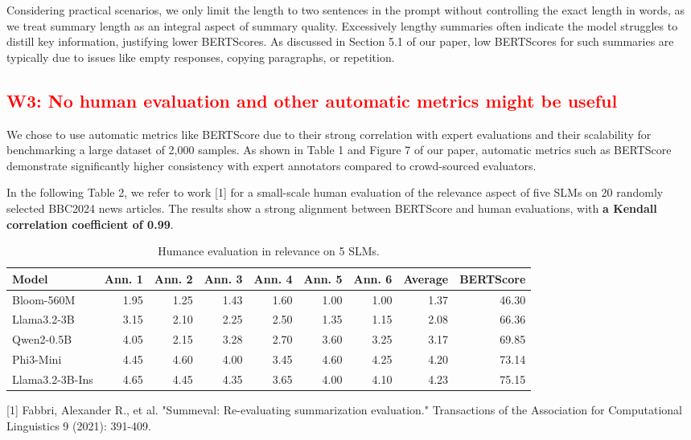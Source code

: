 \documentclass[a4paper]{article}
\begin{document}
Considering practical scenarios, we only limit the length to two sentences in the prompt without controlling the exact length in words, as we treat summary length as an integral aspect of summary quality. Excessively lengthy summaries often indicate the model struggles to distill key information, justifying lower BERTScores. As discussed in Section 5.1 of our paper, low BERTScores for such summaries are typically due to issues like empty responses, copying paragraphs, or repetition.





\subsection{\textcolor{red}{W3: No human evaluation and other automatic metrics might be useful}}

{We chose to use automatic metrics like BERTScore due to their strong correlation with expert evaluations and their scalability for benchmarking a large dataset of 2,000 samples. As shown in Table 1 and Figure 7 of our paper, automatic metrics such as BERTScore demonstrate significantly higher consistency with expert annotators compared to crowd-sourced evaluators.}

{In the following Table 2, we refer to work [1] for a small-scale human evaluation of the relevance aspect of five SLMs on 20 randomly selected BBC2024 news articles. The results show a strong alignment between BERTScore and human evaluations, with \textbf{a Kendall correlation coefficient of 0.99}.}

\begin{table}[h]
\centering
\caption{Humance evaluation in relevance on 5 SLMs.}
\label{tab:my-table}
\begin{tabular}{lrrrrrrrr}
\hline
Model           & Ann. 1 & Ann. 2 & Ann. 3 & Ann. 4 & Ann. 5 & Ann. 6 & Average & BERTScore \\ \hline
Bloom-560M      & 1.95   & 1.25   & 1.43   & 1.60   & 1.00   & 1.00   & 1.37    & 46.30     \\
Llama3.2-3B     & 3.15   & 2.10   & 2.25   & 2.50   & 1.35   & 1.15   & 2.08    & 66.36     \\
Qwen2-0.5B      & 4.05   & 2.15   & 3.28   & 2.70   & 3.60   & 3.25   & 3.17    & 69.85     \\
Phi3-Mini       & 4.45   & 4.60   & 4.00   & 3.45   & 4.60   & 4.25   & 4.20    & 73.14     \\
Llama3.2-3B-Ins & 4.65   & 4.45   & 4.35   & 3.65   & 4.00   & 4.10   & 4.23    & 75.15     \\ \hline
\end{tabular}
\end{table}
[1] Fabbri, Alexander R., et al. "Summeval: Re-evaluating summarization evaluation." Transactions of the Association for Computational Linguistics 9 (2021): 391-409.
\end{document}
